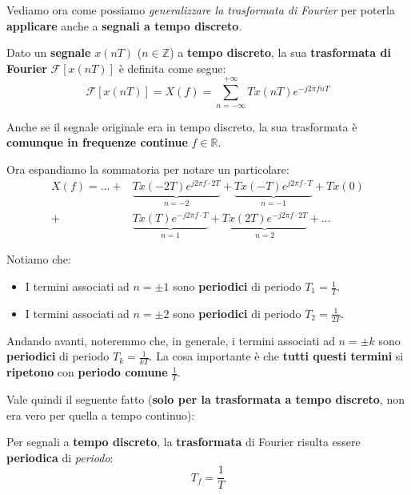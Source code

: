 Vediamo ora come possiamo \textit{generalizzare la trasformata di Fourier} per 
poterla \textbf{applicare} anche a \textbf{segnali a tempo discreto}.

\begin{definition}
    Dato un \textbf{segnale} $x(nT)$ ($n\in \mathbb{Z}$) a \textbf{tempo discreto}, la sua
    \textbf{trasformata di Fourier} $\mathcal{F}[x(nT)]$ è definita come segue:
    \[
        \mathcal{F}[x(nT)] = X(f) = \sum_{n=-\infty}^{+\infty} T x(nT) e^{-j 2\pi fnT}
    \] 
\end{definition}

\begin{remark}
    Anche se il segnale originale era in tempo discreto, la sua trasformata
    è \textbf{comunque in frequenze continue} $f\in \mathbb{R}$.
\end{remark}

Ora espandiamo la sommatoria per notare un particolare:
\[
    \begin{aligned}
        X(f) = \ldots +& \underbrace{ Tx(-2T) e^{j 2\pi f\cdot 2T} }_{n=-2} + 
                  \underbrace{ Tx(-T) e^{j 2\pi f\cdot T} }_{n=-1}
                 + Tx(0) \\ 
                 +& \underbrace{ Tx(T) e^{-j 2\pi f\cdot T} }_{n=1} + 
                  \underbrace{ Tx(2T) e^{-j 2\pi f\cdot 2T} }_{n=2} + \ldots 
    \end{aligned}
\]

Notiamo che:
\begin{itemize}
    \item I termini associati ad $n= \pm 1$ sono \textbf{periodici} di periodo $T_{1} = \frac{1}{T}$.
    \item I termini associati ad $n= \pm 2$ sono \textbf{periodici} di periodo $T_{2} = \frac{1}{2T}$.
\end{itemize}

Andando avanti, noteremmo che, in generale, i termini associati ad $n= \pm k$ sono 
\textbf{periodici} di periodo $T_{k} = \frac{1}{kT}$. La cosa importante è che
\textbf{tutti questi termini} si \textbf{ripetono} con \textbf{periodo comune} $\frac{1}{T}$.

Vale quindi il seguente fatto (\textbf{solo per la trasformata a
tempo discreto}, non era vero per quella a tempo continuo):

\begin{remark}[PERIODICITA']
    Per segnali a \textbf{tempo discreto}, la \textbf{trasformata} di Fourier 
    risulta essere \textbf{periodica} di \textit{periodo}:
    \[
        T_f = \frac{1}{T}
    \] 
\end{remark}

